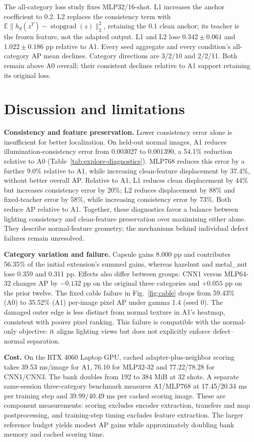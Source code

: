 The all-category loss study fixes MLP32/16-shot. L1 increases the anchor coefficient to 0.2. L2 replaces the consistency term with $\mathbb{E}\|h_\theta(z^T)-\operatorname{stopgrad}(z)\|_2^2$, retaining the 0.1 clean anchor; its teacher is the frozen feature, not the adapted output. L1 and L2 lose $0.342\pm0.061$ and $1.022\pm0.186$ pp relative to A1. Every seed aggregate and every condition's all-category AP mean declines. Category directions are 3/2/10 and 2/2/11. Both remain above A0 overall; their consistent declines relative to A1 support retaining its original loss.

\section{Discussion and limitations}
\label{sec:discussion}
\textbf{Consistency and feature preservation.} Lower consistency error alone is insufficient for better localization. On held-out normal images, A1 reduces illumination-consistency error from 0.003027 to 0.001390, a 54.1\% reduction relative to A0 (Table~\ref{tab:explore-diagnostics}). MLP768 reduces this error by a further 9.0\% relative to A1, while increasing clean-feature displacement by 37.4\%, without better overall AP. Relative to A1, L1 reduces clean displacement by 44\% but increases consistency error by 20\%; L2 reduces displacement by 88\% and fixed-teacher error by 58\%, while increasing consistency error by 73\%. Both reduce AP relative to A1. Together, these diagnostics favor a balance between lighting consistency and clean-feature preservation over maximizing either alone. They describe normal-feature geometry; the mechanisms behind individual defect failures remain unresolved.

\textbf{Category variation and failure.} Capsule gains 8.000 pp and contributes 56.35\% of the initial extension's summed gains, whereas hazelnut and metal\_nut lose 0.359 and 0.311 pp. Effects also differ between groups: CNN1 versus MLP64-32 changes AP by $-0.132$ pp on the original three categories and $+0.055$ pp on the prior twelve. The fixed cable failure in Fig.~\ref{fig:cable} drops from 59.43\% (A0) to 35.52\% (A1) per-image pixel AP under gamma 1.4 (seed 0). The damaged outer edge is less distinct from normal texture in A1's heatmap, consistent with poorer pixel ranking. This failure is compatible with the normal-only objective: it aligns lighting views but does not explicitly enforce defect--normal separation.

\textbf{Cost.} On the RTX 4060 Laptop GPU, cached adapter-plus-neighbor scoring takes 39.53 ms/image for A1, 76.10 for MLP32-32 and 77.22/78.28 for CNN1/CNN3. The bank doubles from 192 to 384 MiB at 32 shots. A separate same-session three-category benchmark measures A1/MLP768 at 17.45/20.34 ms per training step and 39.99/40.49 ms per cached scoring image. These are component measurements: scoring excludes encoder extraction, transfers and map postprocessing, and training-step timing excludes feature extraction. The larger reference budget yields modest AP gains while approximately doubling bank memory and cached scoring time.

